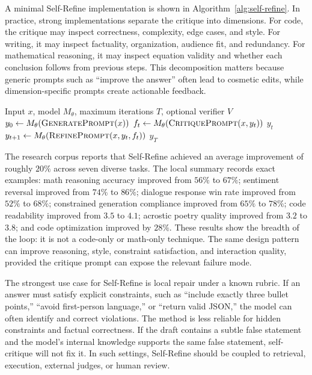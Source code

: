 A minimal Self-Refine implementation is shown in Algorithm~\ref{alg:self-refine}. In practice, strong implementations separate the critique into dimensions. For code, the critique may inspect correctness, complexity, edge cases, and style. For writing, it may inspect factuality, organization, audience fit, and redundancy. For mathematical reasoning, it may inspect equation validity and whether each conclusion follows from previous steps. This decomposition matters because generic prompts such as ``improve the answer'' often lead to cosmetic edits, while dimension-specific prompts create actionable feedback.

\begin{algorithm}[t]
\caption{Self-Refine inference loop}
\label{alg:self-refine}
\begin{algorithmic}[1]
\Require Input $x$, model $M_\theta$, maximum iterations $T$, optional verifier $V$
\State $y_0 \gets M_\theta(\textsc{GeneratePrompt}(x))$
    \State $f_t \gets M_\theta(\textsc{CritiquePrompt}(x,y_t))$
        \State \Return $y_t$
    \EndIf
    \State $y_{t+1} \gets M_\theta(\textsc{RefinePrompt}(x,y_t,f_t))$
\EndFor
\State \Return $y_T$
\end{algorithmic}
\end{algorithm}

The research corpus reports that Self-Refine achieved an average improvement of roughly $20\%$ across seven diverse tasks. The local summary records exact examples: math reasoning accuracy improved from $56\%$ to $67\%$; sentiment reversal improved from $74\%$ to $86\%$; dialogue response win rate improved from $52\%$ to $68\%$; constrained generation compliance improved from $65\%$ to $78\%$; code readability improved from $3.5$ to $4.1$; acrostic poetry quality improved from $3.2$ to $3.8$; and code optimization improved by $28\%$. These results show the breadth of the loop: it is not a code-only or math-only technique. The same design pattern can improve reasoning, style, constraint satisfaction, and interaction quality, provided the critique prompt can expose the relevant failure mode.

The strongest use case for Self-Refine is local repair under a known rubric. If an answer must satisfy explicit constraints, such as ``include exactly three bullet points,'' ``avoid first-person language,'' or ``return valid JSON,'' the model can often identify and correct violations. The method is less reliable for hidden constraints and factual correctness. If the draft contains a subtle false statement and the model's internal knowledge supports the same false statement, self-critique will not fix it. In such settings, Self-Refine should be coupled to retrieval, execution, external judges, or human review.

